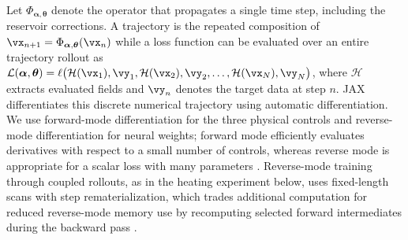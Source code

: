 \documentclass{article} %
\begin{document}
Let \(\Phi_{\boldsymbol{\alpha},\boldsymbol{\theta}}\) denote the operator that propagates a single time step, including the reservoir corrections. A trajectory is the repeated composition of $\vx_{n+1}=\Phi_{\boldsymbol{\alpha},\boldsymbol{\theta}}(\vx_n)$ while a loss function can be evaluated over an entire trajectory rollout as $\mathcal{L}(\boldsymbol{\alpha},\boldsymbol{\theta})=\ell\bigl(\mathcal{H}(\vx_1),\vy_1,\mathcal{H}(\vx_2),\vy_2,\ldots,\mathcal{H}(\vx_N),\vy_N\bigr)$, where \(\mathcal{H}\) extracts evaluated fields and \(\vy_n\) denotes the target data at step \(n\). JAX differentiates this discrete numerical trajectory using automatic differentiation. We use forward-mode differentiation for the three physical controls and reverse-mode differentiation for neural weights; forward mode efficiently evaluates derivatives with respect to a small number of controls, whereas reverse mode is appropriate for a scalar loss with many parameters \citep{baydin2018autodiff,jax2024autodiff}. Reverse-mode training through coupled rollouts, as in the heating experiment below, uses fixed-length scans with step rematerialization, which trades additional computation for reduced reverse-mode memory use by recomputing selected forward intermediates during the backward pass \citep{jax2024checkpoint}.
\end{document}
